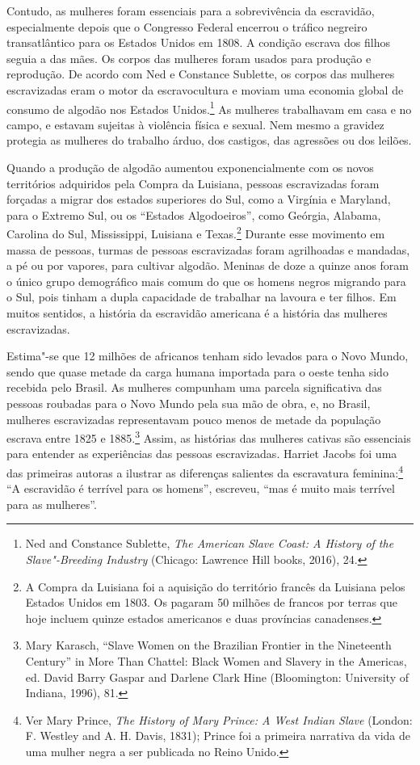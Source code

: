 Contudo, as mulheres foram essenciais para a sobrevivência da
escravidão, especialmente depois que o Congresso Federal encerrou o
tráfico negreiro transatlântico para os Estados Unidos em 1808. A
condição escrava dos filhos seguia a das mães. Os corpos das mulheres
foram usados para produção e reprodução. De acordo com Ned e Constance
Sublette, os corpos das mulheres escravizadas eram o motor da
escravocultura e moviam uma economia global de consumo de algodão nos
Estados Unidos.\footnote{Ned and Constance Sublette, \emph{The American
  Slave Coast: A History of the Slave"-Breeding Industry} (Chicago:
  Lawrence Hill books, 2016), 24.} As mulheres trabalhavam em casa e no
campo, e estavam sujeitas à violência física e sexual. Nem mesmo a
gravidez protegia as mulheres do trabalho árduo, dos castigos, das
agressões ou dos leilões.

Quando a produção de algodão aumentou exponencialmente com os novos
territórios adquiridos pela Compra da Luisiana, pessoas escravizadas
foram forçadas a migrar dos estados superiores do Sul, como a Virgínia e
Maryland, para o Extremo Sul, ou os ``Estados Algodoeiros'', como
Geórgia, Alabama, Carolina do Sul, Mississippi, Luisiana e
Texas.\footnote{A Compra da Luisiana foi a aquisição do território
  francês da Luisiana pelos Estados Unidos em 1803. Os  pagaram 50
  milhões de francos por terras que hoje incluem quinze estados
  americanos e duas províncias canadenses.} Durante esse movimento em
massa de pessoas, turmas de pessoas escravizadas foram agrilhoadas e
mandadas, a pé ou por vapores, para cultivar algodão. Meninas de doze a
quinze anos foram o único grupo demográfico mais comum do que os homens
negros migrando para o Sul, pois tinham a dupla capacidade de trabalhar
na lavoura e ter filhos. Em muitos sentidos, a história da escravidão
americana é a história das mulheres escravizadas.

Estima"-se que 12 milhões de africanos tenham sido levados para o Novo
Mundo, sendo que quase metade da carga humana importada para o oeste
tenha sido recebida pelo Brasil. As mulheres compunham uma parcela
significativa das pessoas roubadas para o Novo Mundo pela sua mão de
obra, e, no Brasil, mulheres escravizadas representavam
pouco menos de metade da população escrava entre 1825 e 1885.\footnote{Mary Karasch,
  ``Slave Women on the Brazilian Frontier in the Nineteenth Century'' in
  More Than Chattel: Black Women and Slavery in the Americas, ed. David
  Barry Gaspar and Darlene Clark Hine (Bloomington: University of
  Indiana, 1996), 81.} Assim, as histórias das mulheres cativas são
essenciais para entender as experiências das pessoas escravizadas.
Harriet Jacobs foi uma das primeiras autoras a ilustrar as diferenças
salientes da escravatura feminina:\footnote{Ver Mary Prince,
  \emph{The History of Mary Prince: A West Indian Slave} (London: F.
  Westley and A. H. Davis, 1831); Prince foi a primeira narrativa da
  vida de uma mulher negra a ser publicada no Reino Unido.} ``A
escravidão é terrível para os homens'', escreveu, ``mas é muito
mais terrível para as mulheres''.

